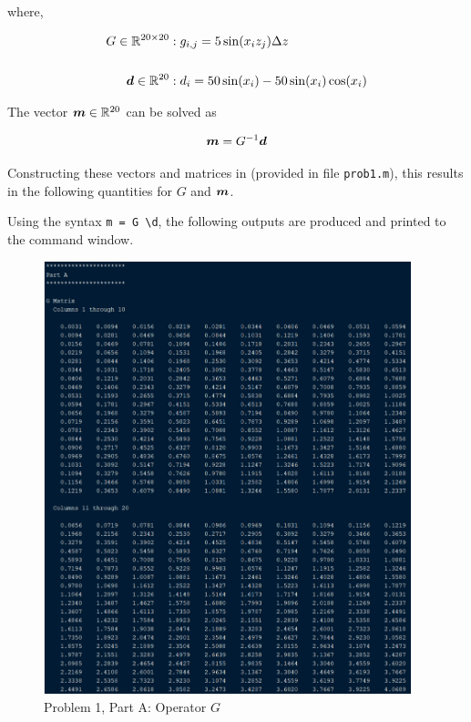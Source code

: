 where,

\begin{align*}
	G \in \mathbb{R}^{20 \times 20} &: g_{i,j} = 5 \sin(x_i z_j) \Delta z \\
	\\
	\boldsymbol{d} \in \mathbb{R}^{20} &: d_i = 50 \sin(x_i) - 50 \sin(x_i) \cos(x_i)
\end{align*}

The vector $\boldsymbol{m} \in \mathbb{R}^{20}$ can be solved as

\begin{align*}
	\boldsymbol{m} = G^{-1} \boldsymbol{d}
\end{align*}

Constructing these vectors and matrices in \MATLAB (provided in file \texttt{prob1.m}), this results in the following quantities for $G$ and $\boldsymbol{m}$.

Using the \MATLAB syntax \texttt{m = G \textbackslash d}, the following outputs are produced and printed to the command window.

\begin{figure}[h] \label{fig: prob 1 part a G}
	\centering
	\includegraphics[width=0.95\textwidth]{./images/prob1_parta_G.png}
	\caption{Problem 1, Part A: Operator $G$}
\end{figure}
\FloatBarrier

